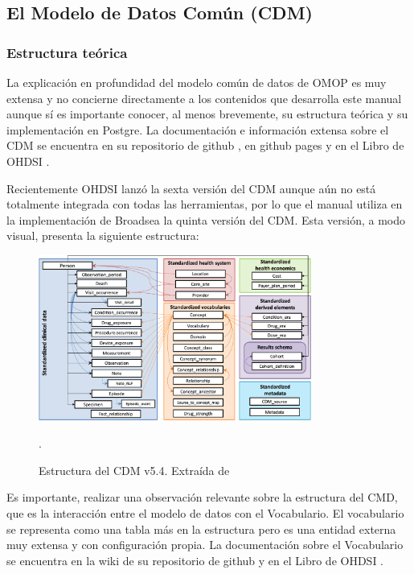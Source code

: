 \subsection{El Modelo de Datos Común (CDM)} \label{subsec:01cdm}

\subsubsection{Estructura teórica}

La explicación en profundidad del modelo común de datos de OMOP es muy extensa y no concierne directamente a los contenidos que desarrolla este manual aunque sí es importante conocer, al menos brevemente, su estructura teórica y su implementación en Postgre. La documentación e información extensa sobre el CDM se encuentra en su repositorio de github  \cite{githubCDM}, en github pages \cite{githubPagesCDM} y en el Libro de OHDSI \cite{TheBookOfOHDSI}.

Recientemente OHDSI lanzó la sexta versión del CDM aunque aún no está totalmente integrada con todas las herramientas, por lo que el manual utiliza en la implementación de Broadsea la quinta versión del CDM. Esta versión, a modo visual, presenta la siguiente estructura:

\begin{figure}[H]
    \centering
    \includegraphics[width=0.80\textwidth]{figures/CDMEstructura.png}
     \caption{Estructura del CDM v5.4. Extraída de \cite{githubPagesCDM}}.
    \label{fig:CDMEstructura}
\end{figure}

Es importante, realizar una observación relevante sobre la estructura del CMD, que es la interacción entre el modelo de datos con el Vocabulario. El vocabulario se representa como una tabla más en la estructura pero es una entidad externa muy extensa y con configuración propia. La documentación sobre el Vocabulario se encuentra en la wiki de su repositorio de github \cite{githubVocabwiki} y en el Libro de OHDSI \cite{TheBookOfOHDSI}.

